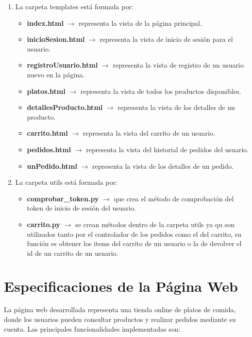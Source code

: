 \documentclass[10pt]{book}
\begin{document}
\begin{enumerate}
        \item La carpeta templates está formada por:
            \begin{itemize}
                \item \textbf{index.html} $\rightarrow$ representa la vista de la página principal.
                \item \textbf{inicioSesion.html} $\rightarrow$ representa la vista de inicio de sesión para el usuario.
                \item \textbf{registroUsuario.html} $\rightarrow$ representa la vista de registro de un usuario nuevo en la página.
                \item \textbf{platos.html} $\rightarrow$ representa la vista de todos los productos disponibles.
                \item \textbf{detallesProducto.html} $\rightarrow$ representa la vista de los detalles de un producto.
                \item \textbf{carrito.html} $\rightarrow$ representa la vista del carrito de un usuario.
                \item \textbf{pedidos.html} $\rightarrow$ representa la vista del historial de pedidos del usuario.
                \item \textbf{unPedido.html} $\rightarrow$ representa la vista de los detalles de un pedido.
            \end{itemize}

        \item La carpeta utils está formada por:
            \begin{itemize}
                \item \textbf{comprobar\_token.py} $\rightarrow$ que crea el método de comprobación del token de inicio de sesión del usuario.
                \item \textbf{carrito.py} $\rightarrow$ se crean métodos  dentro de la carpeta utils ya qu son utilizados tanto por el controlador de los pedidos como el del carrito, su función es obtener los items del carrito de un usuario o la de devolver el id de un carrito de un usuario.
            \end{itemize}
    \end{enumerate} 
        
\section{Especificaciones de la Página Web}

La página web desarrollada representa una tienda online de platos de comida, donde los usuarios pueden consultar productos y realizar pedidos mediante su cuenta. Las principales funcionalidades implementadas son:
\end{document}
